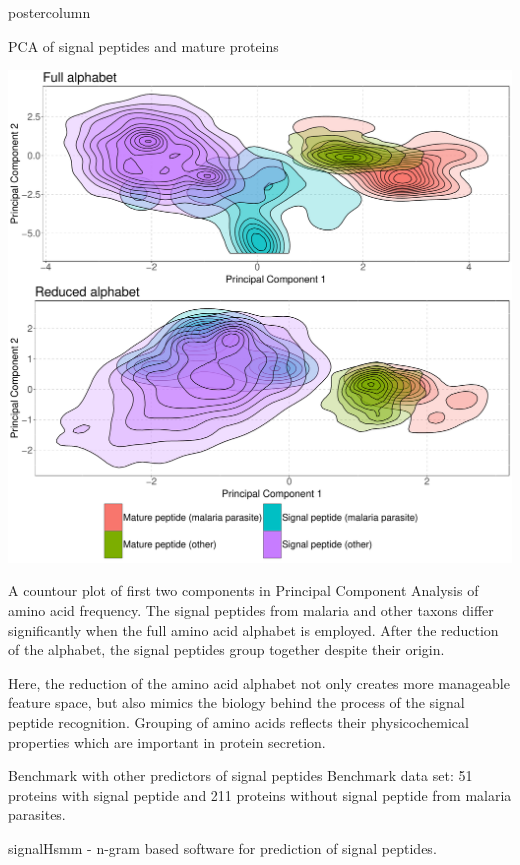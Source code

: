\documentclass[final]{beamer}\usepackage[]{graphicx}\usepackage[]{color}
\makeatletter
\def\maxwidth{ %
  \ifdim\Gin@nat@width>\linewidth
    \linewidth
  \else
    \Gin@nat@width
  \fi
}
\makeatother
\begin{document}
\begin{frame}
\begin{columns}
\begin{column}{.50\textwidth}
\begin{beamercolorbox}[center,wd=\textwidth]{postercolumn}
\begin{minipage}[T]{.95\textwidth}
{     \begin{block}{PCA of signal peptides and mature proteins}

\includegraphics[width=\maxwidth]{figure/unnamed-chunk-6-1} 


A countour plot of first two components in Principal Component 
Analysis of amino acid frequency. The signal peptides from malaria and other 
taxons differ significantly when the full amino acid alphabet is employed. After 
the reduction of the alphabet, the signal peptides group together despite their 
origin.

\bigskip

Here, the reduction of the amino acid alphabet not only creates more manageable 
feature space, but also mimics the biology behind the process of the signal 
peptide recognition. Grouping of amino acids reflects their physicochemical 
properties which are important in protein secretion.

    \end{block}
    \vfill

    
    \begin{block}{Benchmark with other predictors of signal peptides}
    Benchmark data set: 51 proteins with signal peptide and 211 proteins 
    without signal peptide from malaria parasites.
    
    signalHsmm - n-gram based software for prediction of signal peptides.
   

\end{block}}
\end{minipage}
\end{beamercolorbox}
\end{column}
\end{columns}
\end{frame}
\end{document}
